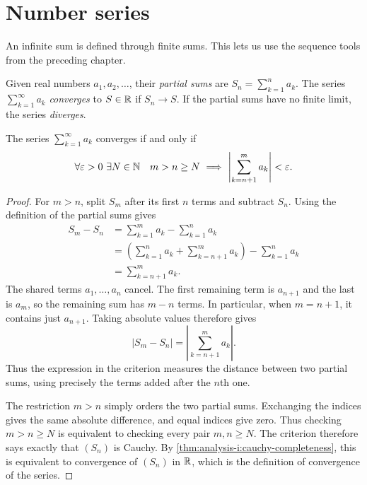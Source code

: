 \section{Number series}
\label{sec:analysis-i:number-series}

An infinite sum is defined through finite sums. This lets us use the
sequence tools from the preceding chapter.

\begin{definition}
  Given real numbers $a_1,a_2,\ldots$, their \emph{partial sums} are
  $S_n=\sum_{k=1}^n a_k$. The series $\sum_{k=1}^{\infty}a_k$
  \emph{converges} to $S\in\mathbb{R}$ if $S_n\to S$. If the partial sums
  have no finite limit, the series \emph{diverges}.
\end{definition}

\begin{theorem}
  \label{thm:analysis-i:series-cauchy}
  The series $\sum_{k=1}^{\infty}a_k$ converges if and only if
  \[
    \forall\varepsilon>0\ \exists N\in\mathbb{N}\quad
    m>n\ge N\ \Longrightarrow\
    \left|\sum_{k=n+1}^{m}a_k\right|<\varepsilon.
  \]
\end{theorem}

\begin{proof}
  For $m>n$, split $S_m$ after its first $n$ terms and subtract $S_n$.
  Using the definition of the partial sums gives
  \begin{align*}
    S_m-S_n
      &=\sum_{k=1}^{m}a_k-\sum_{k=1}^{n}a_k\\
      &=\left(\sum_{k=1}^{n}a_k+\sum_{k=n+1}^{m}a_k\right)
        -\sum_{k=1}^{n}a_k\\
      &=\sum_{k=n+1}^{m}a_k.
  \end{align*}
  The shared terms $a_1,\ldots,a_n$ cancel. The first remaining term
  is $a_{n+1}$ and the last is $a_m$, so the remaining sum has $m-n$
  terms. In particular, when $m=n+1$, it contains just $a_{n+1}$.
  Taking absolute values therefore gives
  \[
    |S_m-S_n|=\left|\sum_{k=n+1}^{m}a_k\right|.
  \]
  Thus the expression in the criterion measures the distance between
  two partial sums, using precisely the terms added after the $n$th one.

  The restriction $m>n$ simply orders the two partial sums. Exchanging the indices
  gives the same absolute difference, and equal indices give zero.
  Thus checking $m>n\ge N$ is equivalent to checking every pair
  $m,n\ge N$. The criterion therefore says exactly that $(S_n)$
  is Cauchy. By \autoref{thm:analysis-i:cauchy-completeness}, this is
  equivalent to convergence of $(S_n)$ in $\mathbb{R}$, which is the definition
  of convergence of the series.
\end{proof}

